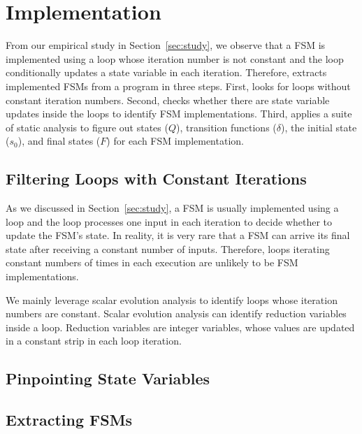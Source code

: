 \section{Implementation}
\label{sec:impl}

From our empirical study in Section~\ref{sec:study},
we observe that a FSM is implemented using a loop 
whose iteration number is not constant  
and the loop conditionally updates a state variable in each iteration. 
Therefore, \Tool{} extracts implemented FSMs from a program in three steps.
First, \Tool{} looks for loops without constant iteration numbers. 
Second, \Tool{} checks whether there are state 
variable updates inside the loops to identify FSM implementations. 
Third, \Tool{} applies a suite 
of static analysis to figure out states ($Q$), 
transition functions ($\delta$), the initial state ($s_0$),
and final states ($F$) for each FSM implementation. 


\subsection{Filtering Loops with Constant Iterations}
As we discussed in Section~\ref{sec:study},
a FSM is usually implemented using a loop 
and the loop processes one input in each iteration to decide 
whether to update the FSM’s state. 
In reality, it is very rare that a FSM can arrive its final state after receiving 
a constant number of inputs. 
Therefore, loops iterating constant numbers of times in each execution 
are unlikely to be FSM implementations. 

We mainly leverage scalar evolution analysis to identify loops 
whose iteration numbers are constant. 
Scalar evolution analysis can identify reduction variables inside a loop.
Reduction variables are integer variables, whose values are updated 
in a constant strip in each loop iteration. 



\subsection{Pinpointing State Variables}


\subsection{Extracting FSMs}

